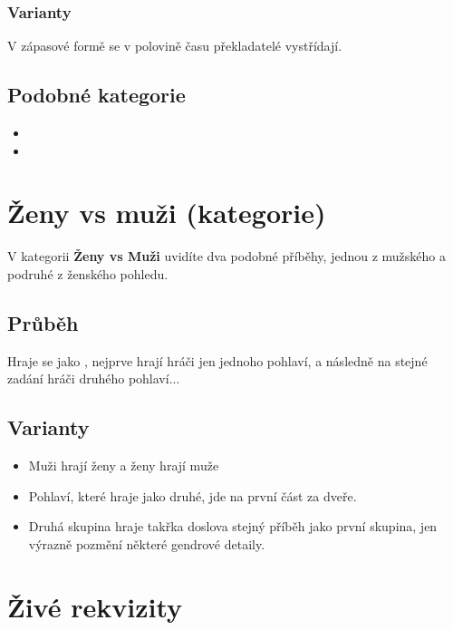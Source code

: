 \subsubsection{ Varianty } V zápasové formě se v polovině času překladatelé vystřídají. 
 
\subsection{ Podobné kategorie } \begin{itemize}
\item  {}
\item  {}
\end{itemize}
 
 
 
 
\needspace{5cm} \section{Ženy vs muži (kategorie)} \label{ženy vs muži (kategorie)}  
 
 
 
V kategorii \textbf{Ženy vs Muži}{} uvidíte dva podobné příběhy, jednou z mužského a podruhé z ženského pohledu. 
 
 
\subsection{Průběh} Hraje se jako , nejprve hrají hráči jen jednoho pohlaví, a následně na stejné zadání hráči druhého pohlaví... 
 
\subsection{ Varianty } \begin{itemize}
\item  Muži hrají ženy a ženy hrají muže
\item  Pohlaví, které hraje jako druhé, jde na první část za dveře.
\item  Druhá skupina hraje takřka doslova stejný příběh jako první skupina, jen výrazně pozmění některé gendrové detaily.
\end{itemize}
 
 
 
 
\needspace{5cm} \section{Živé rekvizity} \label{živé rekvizity}  
 
